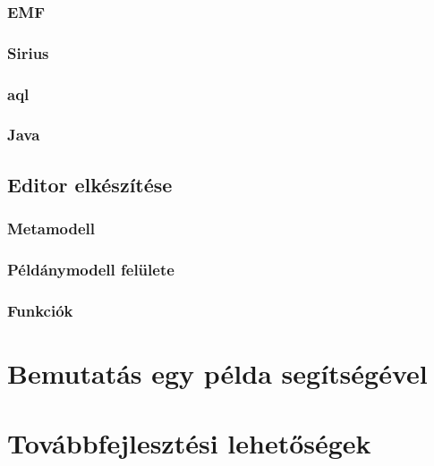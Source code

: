 \documentclass[12pt]{article}
\begin{document}
	\subsubsection{EMF}
	\subsubsection{Sirius}
	\subsubsection{aql}
	\subsubsection{Java}
	\subsection{Editor elkészítése}
	\subsubsection{Metamodell}
	\subsubsection{Példánymodell felülete}
	\subsubsection{Funkciók}
	\section{Bemutatás egy példa segítségével}
	\section{Továbbfejlesztési lehetőségek}
	
\end{document}
